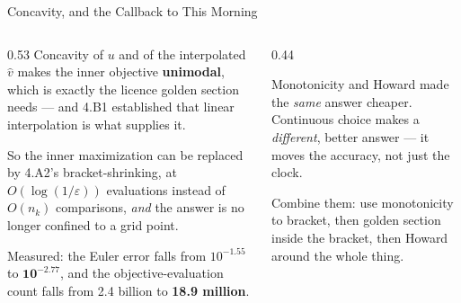 \begin{frame}{Concavity, and the Callback to This Morning}
\begin{columns}[T]
\begin{column}{0.53\textwidth}
\small
Concavity of $u$ and of the interpolated $\hat v$ makes the inner objective \textbf{unimodal}, which is exactly the licence golden section needs --- and 4.B1 established that linear interpolation is what supplies it.
\medskip

So the inner maximization can be replaced by 4.A2's bracket-shrinking, at $O(\log(1/\varepsilon))$ evaluations instead of $O(n_k)$ comparisons, \emph{and} the answer is no longer confined to a grid point.
\medskip

Measured: the Euler error falls from $10^{-1.55}$ to $\mathbf{10^{-2.77}}$, and the objective-evaluation count falls from 2.4 billion to \textbf{18.9 million}.
\end{column}
\begin{column}{0.44\textwidth}
\begin{conceptbox}[title=\textbf{Two gains, one change}]\small
Monotonicity and Howard made the \emph{same} answer cheaper. Continuous choice makes a \emph{different}, better answer --- it moves the accuracy, not just the clock.
\end{conceptbox}
\medskip
\begin{examplebox}\footnotesize
Combine them: use monotonicity to bracket, then golden section inside the bracket, then Howard around the whole thing.
\end{examplebox}
\end{column}
\end{columns}
\vspace{1mm}
\end{frame}

